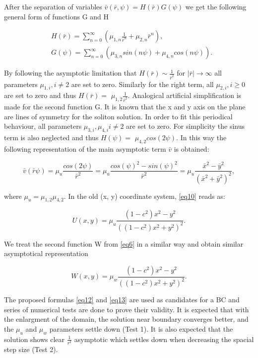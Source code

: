 \documentclass[12pt]{article}
\theoremstyle{theorem}
\theoremstyle{defi}
\begin{document}
After the separation of variables $\bar{v}(\bar{r}, \psi) = H(\bar{r})G(\psi)$  we get the following general form of functions G and H 

\begin{align}
&H(\bar{r}) = \sum^{\infty}_{n=0} (\mu_{1,n} \frac{1}{ \bar{r}^n} + \mu_{2,n} \bar{r}^n ),
\\ \nonumber &G(\psi) = \sum^{\infty}_{n=0} (\mu_{3,n}sin(n \psi ) + \mu_{4,n}cos(n \psi)). \label{eq9}
\end{align}

By following the asymptotic limitation that $H(\bar{r}) \sim \frac{1}{\bar{r}^2} $  for $|\bar{r}| \rightarrow \infty $ all parameters $\mu_{1,i}, i \neq 2$  are set to zero. Similarly for the right term, all $\mu_{2,i},  i \geq 0$ are set to zero and thus $H(\bar{r}) =$ $\mu_{1,2} \frac{1}{ \bar{r}^2 }$.
Analogical artificial simplification is made for the second function G. It is known that the x and y axis on the plane are lines of symmetry for the soliton solution. In order to fit this periodical behaviour, all parameters $\mu_{3,i},\mu_{4,i}  i \neq 2$  are set to zero. For simplicity the sinus term is also neglected and thus $H(\psi) = $ $\mu_{4,2} cos(2 \psi)$. In this way the following representation of the main asymptotic term $\bar{v}$ is obtained:

\begin{equation}
\bar{v}(\bar{r} \psi) = \mu_u \frac{cos(2 \psi)}{ \bar{r}^2 } = 
 \mu_u \frac{cos(\psi) ^ 2 - sin(\psi)^2}{ \bar{r}^2 } = 
 \mu_u \frac{\bar{x}  ^ 2 - \bar{y}  ^ 2}{( \bar{x}  ^ 2 + \bar{y}  ^ 2)^2 } , \label{eq10}
\end{equation}

where $\mu_u = \mu_{1,2} \mu_{4,2}$. In the old (x, y) coordinate system, \ref{eq10}  reads as:

\begin{equation}
U(x,y) = \mu_u \frac{(1-c^2)x^2 - y^2}{ ( (1-c^2)x^2 + y^2 )^2 }. \label{eq12}
\end{equation}

We treat the second function W from \ref{eq6}  in a similar way and obtain similar  asymptotical representation

\begin{equation}
W(x,y) = \mu_w \frac{(1-c^2)x^2 - y^2}{ ( (1-c^2)x^2 + y^2 )^2 }. \label{eq13}
\end{equation}


The proposed formulas \ref{eq12} and \ref{eq13} are used as candidates for a BC and series of numerical tests are done to prove their validity. 
It is expected that with the enlargment of the domain, the solution near boundary converges better, and the $\mu_u$ and $\mu_w$ parameters settle down (Test 1). It is also expected that the solution shows clear $\frac{1}{r^2}$ asymptotic which settles down when decreasing the spacial step size (Test 2).
\end{document}
